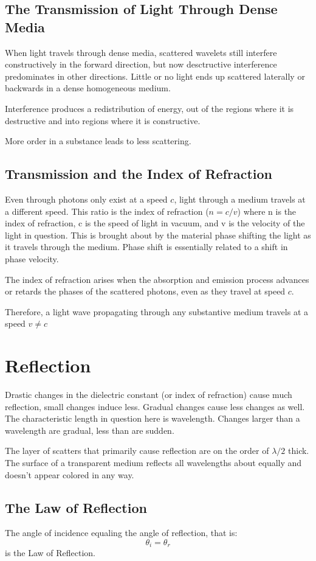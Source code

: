 \documentclass[12pt]{report}
\begin{document}
\subsection{The Transmission of Light Through Dense Media}
When light travels through dense media, scattered wavelets still interfere constructively in the forward direction, but now desctructive interference predominates in other directions. Little or no  light ends up scattered laterally or backwards in a dense homogeneous medium. 

Interference produces a redistribution of energy, out of the regions where it is destructive and into regions where it is constructive. 

More order in a substance leads to less scattering. 
\subsection{Transmission and the Index of Refraction}
Even through photons only exist at a speed $c$, light through a medium travels at a different speed. This ratio is the index of refraction ($n = c/v$) where n is the index of refraction, c is the speed of light in vacuum, and v is the velocity of the light in question. This is brought about by the material phase shifting the light as it travels through the medium. Phase shift is essentially related to a shift in phase velocity. 

The index of refraction arises when the absorption and emission process advances or retards the phases of the scattered photons, even as they travel at speed $c$.

Therefore, a light wave propagating through any substantive medium travels at a speed $v \neq c$

\section{Reflection}
Drastic changes in the dielectric constant (or index of refraction) cause much reflection, small changes induce less. Gradual changes cause less changes as well. The characteristic length in question here is wavelength. Changes larger than a wavelength are gradual, less than are sudden. 

The layer of scatters that primarily cause reflection are on the order of $\lambda/2$ thick. The surface of a transparent medium reflects all wavelengths about equally and doesn't appear colored in any way. 

\subsection{The Law of Reflection}
The angle of incidence equaling the angle of reflection, that is:
\begin{equation}
\theta_i = \theta_r
\end{equation}
is the Law of Reflection. 
\end{document}
